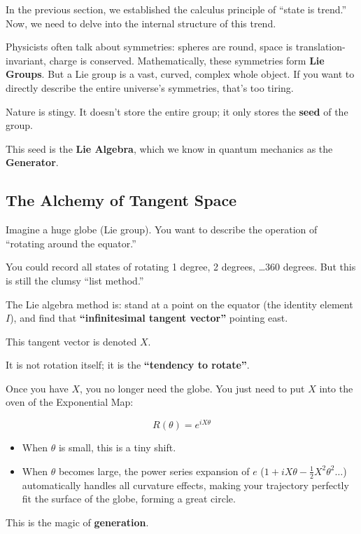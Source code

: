 \documentclass[11pt,a4paper,twoside]{book}
\begin{document}
In the previous section, we established the calculus principle of ``state is trend.'' Now, we need to delve into the internal structure of this trend.

Physicists often talk about symmetries: spheres are round, space is translation-invariant, charge is conserved. Mathematically, these symmetries form \textbf{Lie Groups}. But a Lie group is a vast, curved, complex whole object. If you want to directly describe the entire universe's symmetries, that's too tiring.

Nature is stingy. It doesn't store the entire group; it only stores the \textbf{seed} of the group.

This seed is the \textbf{Lie Algebra}, which we know in quantum mechanics as the \textbf{Generator}.

\subsection{The Alchemy of Tangent Space}

Imagine a huge globe (Lie group). You want to describe the operation of ``rotating around the equator.''

You could record all states of rotating 1 degree, 2 degrees, \ldots 360 degrees. But this is still the clumsy ``list method.''

The Lie algebra method is: stand at a point on the equator (the identity element $I$), and find that \textbf{``infinitesimal tangent vector''} pointing east.

This tangent vector is denoted $X$.

It is not rotation itself; it is the \textbf{``tendency to rotate''}.

Once you have $X$, you no longer need the globe. You just need to put $X$ into the oven of the Exponential Map:

$$R(\theta) = e^{i X \theta}$$

\begin{itemize}
\item When $\theta$ is small, this is a tiny shift.

\item When $\theta$ becomes large, the power series expansion of $e$ ($1 + iX\theta - \frac{1}{2}X^2\theta^2 \ldots$) automatically handles all curvature effects, making your trajectory perfectly fit the surface of the globe, forming a great circle.
\end{itemize}

This is the magic of \textbf{generation}.
\end{document}
